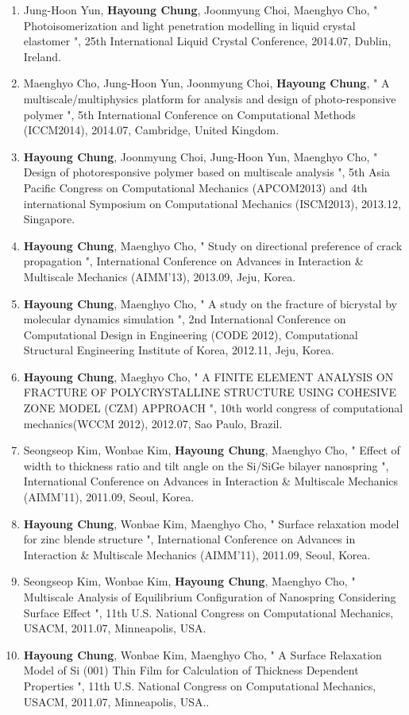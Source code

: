 \documentclass[margin, 10pt]{res} %
\begin{document}
\begin{resume}
\begin{enumerate}
    \item Jung-Hoon Yun, \textbf{Hayoung Chung}, Joonmyung Choi, Maenghyo Cho, " Photoisomerization and light penetration modelling in liquid crystal elastomer ", 25th International Liquid Crystal Conference, 2014.07, Dublin, Ireland.
    \item Maenghyo Cho, Jung-Hoon Yun, Joonmyung Choi, \textbf{Hayoung Chung}, " A multiscale/multiphysics platform for analysis and design of photo-responsive polymer ", 5th International Conference on Computational Methods (ICCM2014), 2014.07, Cambridge, United Kingdom.
    \item \textbf{Hayoung Chung}, Joonmyung Choi, Jung-Hoon Yun, Maenghyo Cho, " Design of photoresponsive polymer based on multiscale analysis ", 5th Asia Pacific Congress on Computational Mechanics (APCOM2013) and 4th international Symposium on Computational Mechanics (ISCM2013), 2013.12, Singapore.
    \item \textbf{Hayoung Chung}, Maenghyo Cho, " Study on directional preference of crack propagation ", International Conference on Advances in Interaction \& Multiscale Mechanics (AIMM'13), 2013.09, Jeju, Korea.
    \item \textbf{Hayoung Chung}, Maenghyo Cho, " A study on the fracture of bicrystal by molecular dynamics simulation ", 2nd International Conference on Computational Design in Engineering (CODE 2012), Computational Structural Engineering Institute of Korea, 2012.11, Jeju, Korea.
    \item \textbf{Hayoung Chung}, Maeghyo Cho, " A FINITE ELEMENT ANALYSIS ON FRACTURE OF POLYCRYSTALLINE STRUCTURE USING COHESIVE ZONE MODEL (CZM) APPROACH ", 10th world congress of computational mechanics(WCCM 2012), 2012.07, Sao Paulo, Brazil.
    \item Seongseop Kim, Wonbae Kim, \textbf{Hayoung Chung}, Maenghyo Cho, " Effect of width to thickness ratio and tilt angle on the Si/SiGe bilayer nanospring ", International Conference on Advances in Interaction \& Multiscale Mechanics (AIMM'11), 2011.09, Seoul, Korea.
    \item \textbf{Hayoung Chung}, Wonbae Kim, Maenghyo Cho, " Surface relaxation model for zinc blende structure ", International Conference on Advances in Interaction \& Multiscale Mechanics (AIMM'11), 2011.09, Seoul, Korea.
    \item Seongseop Kim, Wonbae Kim, \textbf{Hayoung Chung}, Maenghyo Cho, " Multiscale Analysis of Equilibrium Configuration of Nanospring Considering Surface Effect ", 11th U.S. National Congress on Computational Mechanics, USACM, 2011.07, Minneapolis, USA.
    \item \textbf{Hayoung Chung}, Wonbae Kim, Maenghyo Cho, " A Surface Relaxation Model of Si (001) Thin Film for Calculation of Thickness Dependent Properties ", 11th U.S. National Congress on Computational Mechanics, USACM, 2011.07, Minneapolis, USA..
\end{enumerate}


\end{resume}
\end{document}
